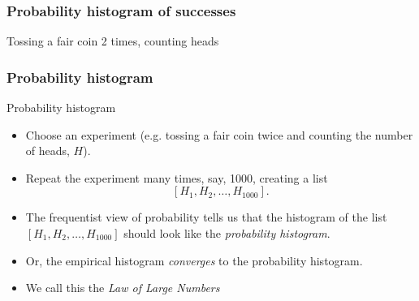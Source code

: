 \documentclass[handout]{beamer}
\begin{document}


   \begin{frame}
   \frametitle{Probability histogram of successes}
   \begin{center}
   \end{center}
   Tossing a fair coin 2 times, counting heads
   \end{frame}


   \begin{frame} \frametitle{Probability histogram}

   \begin{block}
     {Probability histogram}
     \begin{itemize}
     \item Choose an experiment (e.g. tossing a fair coin twice and
     counting the number of heads, $H$).
     \item Repeat the experiment many times, say, 1000, creating a list
     $$
     [H_1, H_2, \dots, H_{1000}].
     $$
     \item The frequentist view of probability tells us that
     the histogram of the list $[H_1, H_2, \dots, H_{1000}]$
     should look like the {\em probability histogram}.

     \item Or, the empirical histogram {\em converges} to the
     probability histogram.
     \item We call this the {\em Law of Large Numbers}
     \end{itemize}
   \end{block}
   \end{frame}

\end{document}
